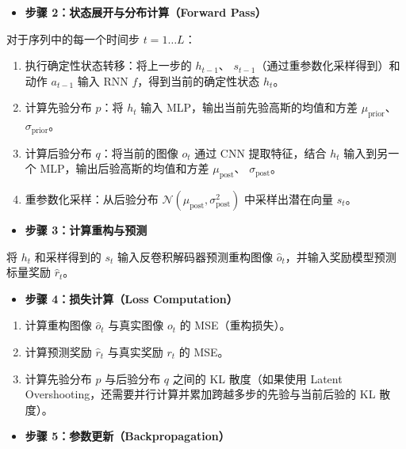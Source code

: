 \begin{itemize}
\tightlist
\item
  \textbf{步骤 2：状态展开与分布计算（Forward Pass）}
\end{itemize}

对于序列中的每一个时间步 \(t = 1 \ldots L\)：

\begin{enumerate}
\def\labelenumi{\arabic{enumi}.}
\tightlist
\item
  执行确定性状态转移：将上一步的 \(h_{t-1}\)、 \(s_{t-1}\)（通过重参数化采样得到）和动作 \(a_{t-1}\) 输入 RNN \(f\)，得到当前的确定性状态 \(h_t\)。
\item
  计算先验分布 \(p\)：将 \(h_t\) 输入 MLP，输出当前先验高斯的均值和方差 \(\mu_{\mathrm{prior}}\)、 \(\sigma_{\mathrm{prior}}\)。
\item
  计算后验分布 \(q\)：将当前的图像 \(o_t\) 通过 CNN 提取特征，结合 \(h_t\) 输入到另一个 MLP，输出后验高斯的均值和方差 \(\mu_{\mathrm{post}}\)、 \(\sigma_{\mathrm{post}}\)。
\item
  重参数化采样：从后验分布 \(\mathcal{N}(\mu_{\mathrm{post}}, \sigma_{\mathrm{post}}^2)\) 中采样出潜在向量 \(s_t\)。
\end{enumerate}

\begin{itemize}
\tightlist
\item
  \textbf{步骤 3：计算重构与预测}
\end{itemize}

将 \(h_t\) 和采样得到的 \(s_t\) 输入反卷积解码器预测重构图像 \(\hat{o}_t\)，并输入奖励模型预测标量奖励 \(\hat{r}_t\)。

\begin{itemize}
\tightlist
\item
  \textbf{步骤 4：损失计算（Loss Computation）}
\end{itemize}

\begin{enumerate}
\def\labelenumi{\arabic{enumi}.}
\tightlist
\item
  计算重构图像 \(\hat{o}_t\) 与真实图像 \(o_t\) 的 MSE（重构损失）。
\item
  计算预测奖励 \(\hat{r}_t\) 与真实奖励 \(r_t\) 的 MSE。
\item
  计算先验分布 \(p\) 与后验分布 \(q\) 之间的 KL 散度（如果使用 Latent Overshooting，还需要并行计算并累加跨越多步的先验与当前后验的 KL 散度）。
\end{enumerate}

\begin{itemize}
\tightlist
\item
  \textbf{步骤 5：参数更新（Backpropagation）}
\end{itemize}

